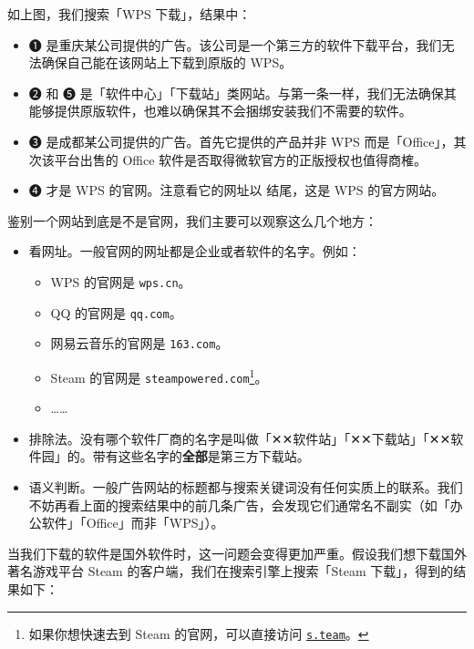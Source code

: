 如上图，我们搜索「WPS 下载」，结果中：

\begin{itemize}
  \item {\color{MissingRed} ➊ 是重庆某公司提供的广告。该公司是一个第三方的软件下载平台，我们无法确保自己能在该网站上下载到原版的 WPS。}
  \item {\color{MissingRed} ➋ 和 ➎ 是「软件中心」「下载站」类网站。与第一条一样，我们无法确保其能够提供原版软件，也难以确保其不会捆绑安装我们不需要的软件。}
  \item {\color{MissingRed} ➌ 是成都某公司提供的广告。首先它提供的产品并非 WPS 而是「Office」，其次该平台出售的 Office 软件是否取得微软官方的正版授权也值得商榷。}
  \item {\color{MissingGreen} ➍ 才是 WPS 的官网。注意看它的网址以  结尾，这是 WPS 的官方网站。}
\end{itemize}

鉴别一个网站到底是不是官网，我们主要可以观察这么几个地方：

\begin{itemize}
  \item 看网址。一般官网的网址都是企业或者软件的名字。例如：
  \begin{itemize}
    \item WPS 的官网是 \texttt{wps.cn}。
    \item QQ 的官网是 \texttt{qq.com}。
    \item 网易云音乐的官网是 \texttt{163.com}。
    \item Steam 的官网是 \texttt{steampowered.com}\footnote{如果你想快速去到 Steam 的官网，可以直接访问 \href{https://s.team}{\texttt{s.team}}。}。
    \item ……
  \end{itemize}
  \item 排除法。没有哪个软件厂商的名字是叫做「✕✕软件站」「✕✕下载站」「✕✕软件园」的。带有这些名字的\textbf{全部}是第三方下载站。
  \item 语义判断。一般广告网站的标题都与搜索关键词没有任何实质上的联系。我们不妨再看上面的搜索结果中的前几条广告，会发现它们通常名不副实（如「办公软件」「Office」而非「WPS」）。
\end{itemize}

当我们下载的软件是国外软件时，这一问题会变得更加严重。假设我们想下载国外著名游戏平台 Steam 的客户端，我们在搜索引擎上搜索「Steam 下载」，得到的结果如下：

